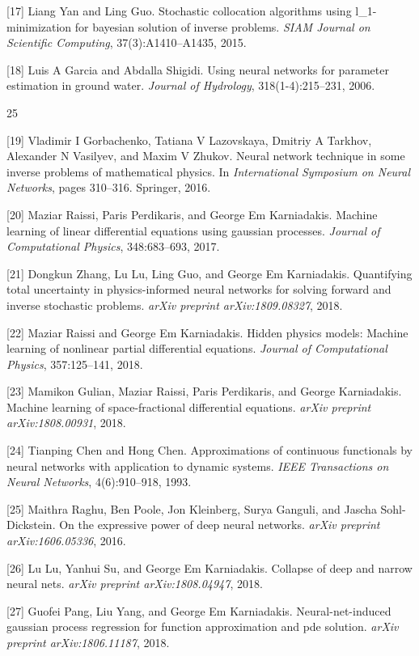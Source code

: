 \documentclass[UTF8]{article}
\begin{document}
[17] Liang Yan and Ling Guo. Stochastic collocation algorithms using l\_1-minimization for bayesian solution of inverse problems. \textit{SIAM Journal on Scientific Computing}, 37(3):A1410--A1435, 2015.

[18] Luis A Garcia and Abdalla Shigidi. Using neural networks for parameter estimation in ground water. \textit{Journal of Hydrology}, 318(1-4):215--231, 2006.

25

[19] Vladimir I Gorbachenko, Tatiana V Lazovskaya, Dmitriy A Tarkhov, Alexander N Vasilyev, and Maxim V Zhukov. Neural network technique in some inverse problems of mathematical physics. In \textit{International Symposium on Neural Networks}, pages 310--316. Springer, 2016.

[20] Maziar Raissi, Paris Perdikaris, and George Em Karniadakis. Machine learning of linear differential equations using gaussian processes. \textit{Journal of Computational Physics}, 348:683--693, 2017.

[21] Dongkun Zhang, Lu Lu, Ling Guo, and George Em Karniadakis. Quantifying total uncertainty in physics-informed neural networks for solving forward and inverse stochastic problems. \textit{arXiv preprint arXiv:1809.08327}, 2018.

[22] Maziar Raissi and George Em Karniadakis. Hidden physics models: Machine learning of nonlinear partial differential equations. \textit{Journal of Computational Physics}, 357:125--141, 2018.

[23] Mamikon Gulian, Maziar Raissi, Paris Perdikaris, and George Karniadakis. Machine learning of space-fractional differential equations. \textit{arXiv preprint arXiv:1808.00931}, 2018.

[24] Tianping Chen and Hong Chen. Approximations of continuous functionals by neural networks with application to dynamic systems. \textit{IEEE Transactions on Neural Networks}, 4(6):910--918, 1993.

[25] Maithra Raghu, Ben Poole, Jon Kleinberg, Surya Ganguli, and Jascha Sohl-Dickstein. On the expressive power of deep neural networks. \textit{arXiv preprint arXiv:1606.05336}, 2016.

[26] Lu Lu, Yanhui Su, and George Em Karniadakis. Collapse of deep and narrow neural nets. \textit{arXiv preprint arXiv:1808.04947}, 2018.

[27] Guofei Pang, Liu Yang, and George Em Karniadakis. Neural-net-induced gaussian process regression for function approximation and pde solution. \textit{arXiv preprint arXiv:1806.11187}, 2018.
\end{document}
